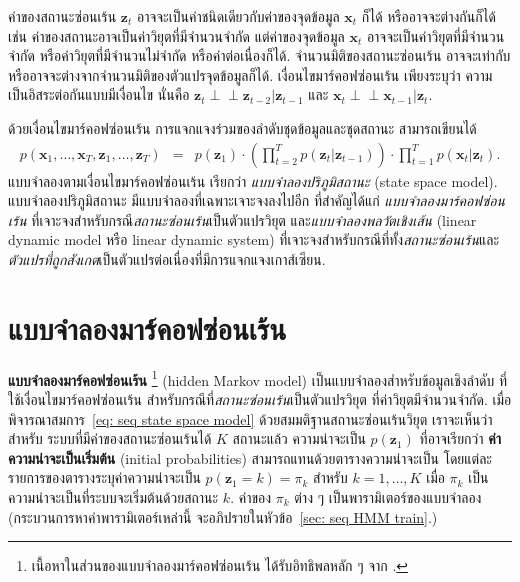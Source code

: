 ค่าของสถานะซ่อนเร้น $\bm{z}_t$ อาจจะเป็นค่าชนิดเดียวกับค่าของจุดข้อมูล $\bm{x}_t$ ก็ได้ หรืออาจจะต่างกันก็ได้
เช่น ค่าของสถานะอาจเป็นค่าวิยุตที่มีจำนวนจำกัด 
แต่ค่าของจุดข้อมูล $\bm{x}_t$ อาจจะเป็นค่าวิยุตที่มีจำนวนจำกัด หรือค่าวิยุตที่มีจำนวนไม่จำกัด หรือค่าต่อเนื่องก็ได้.
จำนวนมิติของสถานะซ่อนเร้น อาจจะเท่ากับ หรืออาจจะต่างจากจำนวนมิติของตัวแปรจุดข้อมูลก็ได้.
เงื่อนไขมาร์คอฟซ่อนเร้น เพียงระบุว่า ความเป็นอิสระต่อกันแบบมีเงื่อนไข นั่นคือ 
$\bm{z}_t \perp \!\!\! \perp \bm{z}_{t-2} | \bm{z}_{t-1}$
และ $\bm{x}_t \perp \!\!\! \perp \bm{x}_{t-1} | \bm{z}_t$.

ด้วยเงื่อนไขมาร์คอฟซ่อนเร้น การแจกแจงร่วมของลำดับชุดข้อมูลและชุดสถานะ สามารถเขียนได้
\begin{eqnarray}
p(\bm{x}_1, \ldots, \bm{x}_T, \bm{z}_1, \ldots, \bm{z}_T)
&=& p(\bm{z}_1) \cdot \left( \prod_{t=2}^T p(\bm{z}_t|\bm{z}_{t-1}) \right) \cdot \prod_{t=1}^T p(\bm{x}_t|\bm{z}_t)
\label{eq: seq state space model} .
\end{eqnarray}
แบบจำลองตามเงื่อนไขมาร์คอฟซ่อนเร้น เรียกว่า \textit{แบบจำลองปริภูมิสถานะ} (state space model).
แบบจำลองปริภูมิสถานะ
มีแบบจำลองที่เฉพาะเจาะจงลงไปอีก
ที่สำคัญได้แก่
\textit{แบบจำลองมาร์คอฟซ่อนเร้น} ที่เจาะจงสำหรับกรณี\textit{สถานะซ่อนเร้น}เป็นตัวแปรวิยุต
และ\textit{แบบจำลองพลวัตเชิงเส้น} (linear dynamic model หรือ linear dynamic system)
ที่เจาะจงสำหรับกรณีที่ทั้ง\textit{สถานะซ่อนเร้น}และ\textit{ตัวแปรที่ถูกสังเกต}เป็นตัวแปรต่อเนื่องที่มีการแจกแจงเกาส์เซียน.

\section{แบบจำลองมาร์คอฟซ่อนเร้น}
\label{sec: HMM}

\textbf{แบบจำลองมาร์คอฟซ่อนเร้น}%
\footnote{%
เนื้อหาในส่วนของแบบจำลองมาร์คอฟซ่อนเร้น ได้รับอิทธิพลหลัก ๆ จาก \cite{Bishop2006a}.
}%
(hidden Markov model)
เป็นแบบจำลองสำหรับข้อมูลเชิงลำดับ ที่ใช้เงื่อนไขมาร์คอฟซ่อนเร้น สำหรับกรณีที่\textit{สถานะซ่อนเร้น}เป็นตัวแปรวิยุต ที่ค่าวิยุตมีจำนวนจำกัด.
เมื่อพิจารณาสมการ~\ref{eq: seq state space model} ด้วยสมมติฐานสถานะซ่อนเร้นวิยุต 
เราจะเห็นว่า
สำหรับ ระบบที่มีค่าของสถานะซ่อนเร้นได้ $K$ สถานะแล้ว
ความน่าจะเป็น $p(\bm{z}_1)$ ที่อาจเรียกว่า \textbf{ค่าความน่าจะเป็นเริ่มต้น} (initial probabilities)
สามารถแทนด้วยตารางความน่าจะเป็น
โดยแต่ละรายการของตารางระบุค่าความน่าจะเป็น $p(\bm{z}_1 =k) = \pi_k$ สำหรับ $k = 1, \ldots, K$
เมื่อ $\pi_k$ เป็นความน่าจะเป็นที่ระบบจะเริ่มต้นด้วยสถานะ $k$.
ค่าของ $\pi_k$ ต่าง ๆ เป็นพารามิเตอร์ของแบบจำลอง (กระบวนการหาค่าพารามิเตอร์เหล่านี้ จะอภิปรายในหัวข้อ~\ref{sec: seq HMM train}.)

